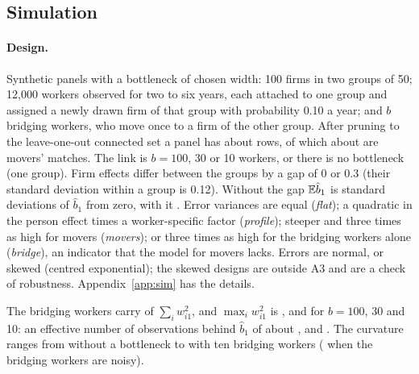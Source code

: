 \subsection{Simulation}\label{sec:q1sim}

\paragraph{Design.} Synthetic panels with a bottleneck of chosen width: 100 firms in two groups of 50; 12,000
workers observed for two to six years, each attached to one group and assigned a newly drawn firm of that
group with probability 0.10 a year; and $b$ bridging workers, who move once to a firm of the other group. After pruning to the
leave-one-out connected set a panel has about  rows, of which about  are
movers' matches. The link is $b=100$, 30 or 10 workers, or there is no bottleneck (one group). Firm effects
differ between the groups by a gap of 0 or 0.3 (their standard deviation within a group is 0.12). Without the
gap $\mathbb{E}\hat b_1$ is  standard deviations of $\hat b_1$ from zero, with it . Error
variances are equal (\emph{flat}); a quadratic
in the person effect times a worker-specific factor (\emph{profile}); steeper and three times as high for movers
(\emph{movers}); or three times as high for the bridging workers alone (\emph{bridge}), an indicator that the
model for movers lacks. Errors are normal, or skewed (centred exponential); the skewed designs are outside A3
and are a check of robustness. Appendix~\ref{app:sim} has the details.

The bridging workers carry  of $\sum_iw_{i1}^2$, and $\max_iw_{i1}^2$ is
,  and  for $b=100$, 30 and 10: an effective number of
observations behind $\hat b_1$ of about ,  and . The curvature ranges
from  without a bottleneck to  with ten bridging workers
( when the bridging workers are noisy).

